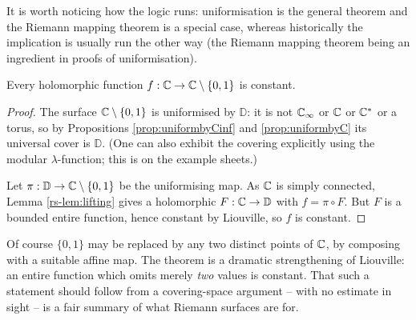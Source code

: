 \documentclass[a4paper]{scrartcl}
\newcommand{\Cinf}{\C_\infty}
\newcommand{\disc}{\mathbb{D}}
\newcommand{\Cs}{\C^*}
\begin{document}
It is worth noticing how the logic runs: uniformisation is the general theorem and the
Riemann mapping theorem is a special case, whereas historically the implication is
usually run the other way (the Riemann mapping theorem being an ingredient in proofs of
uniformisation).

\begin{theorem}
	Every holomorphic function $f : \mathbb{C} \to \mathbb{C}\setminus\{0,1\}$ is constant.
\end{theorem}

\begin{proof}
	The surface $\mathbb{C}\setminus\{0,1\}$ is uniformised by $\disc$: it is not $\Cinf$ or $\mathbb{C}$
	or $\Cs$ or a torus, so by Propositions \ref{prop:uniformbyCinf} and
	\ref{prop:uniformbyC} its universal cover is $\disc$. (One can also exhibit the covering
	explicitly using the modular $\lambda$-function; this is on the example sheets.)

	Let $\pi : \disc \to \C\setminus\{0,1\}$ be the uniformising map. As $\mathbb{C}$ is simply
	connected, Lemma \ref{rs-lem:lifting} gives a holomorphic $F : \C \to \disc$ with
	$f = \pi\circ F$. But $F$ is a bounded entire function, hence constant by Liouville, so
	$f$ is constant.
\end{proof}

Of course $\{0,1\}$ may be replaced by any two distinct points of $\mathbb{C}$, by composing with
a suitable affine map. The theorem is a dramatic strengthening of Liouville: an entire
function which omits merely \emph{two} values is constant. That such a statement should
follow from a covering-space argument -- with no estimate in sight -- is a fair summary of
what Riemann surfaces are for.
\end{document}
